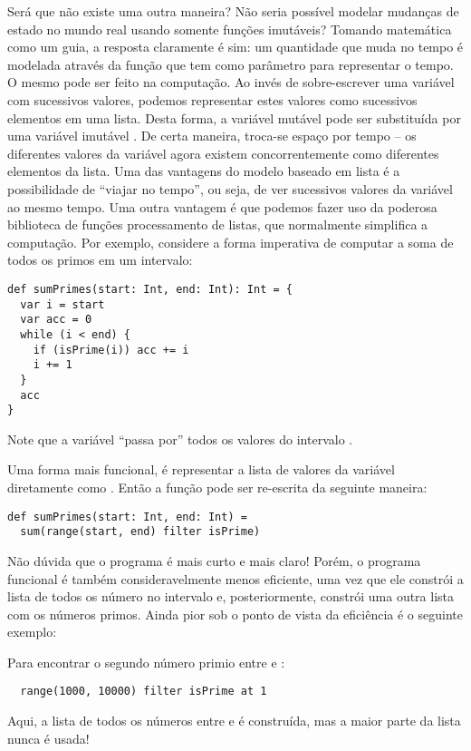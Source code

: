 Será que não existe uma outra maneira? Não seria possível modelar
mudanças de estado no mundo real usando somente funções imutáveis?
Tomando matemática como um guia, a resposta claramente é sim: um
quantidade que muda no tempo é modelada através da função 
que tem como parâmetro  para representar o tempo. O mesmo pode
ser feito na computação. Ao invés de sobre-escrever uma variável com
sucessivos valores, podemos representar estes valores como sucessivos
elementos em uma lista.  Desta forma, a variável mutável  pode ser substituída por uma variável imutável .  De certa maneira, troca-se espaço por tempo -- os
diferentes valores da variável agora existem concorrentemente como
diferentes elementos da lista. Uma das vantagens do modelo baseado em
lista é a possibilidade de ``viajar no tempo'', ou seja, de ver
sucessivos valores da variável ao mesmo tempo. Uma outra vantagem é
que podemos fazer uso da poderosa biblioteca de funções processamento
de listas, que normalmente simplifica a computação. Por exemplo,
considere a forma imperativa de computar a soma de todos os primos em
um intervalo:
\begin{lstlisting}
def sumPrimes(start: Int, end: Int): Int = {
  var i = start
  var acc = 0
  while (i < end) {
    if (isPrime(i)) acc += i
    i += 1
  }
  acc
}
\end{lstlisting}
Note que a variável  ``passa por'' todos os valores do intervalo
.

Uma forma mais funcional, é representar a lista de valores da
variável  diretamente como .  Então a
função pode ser re-escrita da seguinte maneira:
\begin{lstlisting}
def sumPrimes(start: Int, end: Int) =
  sum(range(start, end) filter isPrime)
\end{lstlisting}

Não dúvida que o programa é mais curto e mais claro! Porém, o 
programa funcional é também consideravelmente menos eficiente, uma
vez que ele constrói a lista de todos os número no intervalo e, posteriormente,
constrói uma outra lista com os números primos. Ainda pior sob o ponto de vista
da eficiência é o seguinte exemplo:

Para encontrar o segundo número primio entre  e :
\begin{lstlisting}
  range(1000, 10000) filter isPrime at 1
\end{lstlisting}
Aqui, a lista de todos os números entre  e  é construída,
mas a maior parte da lista nunca é usada!

